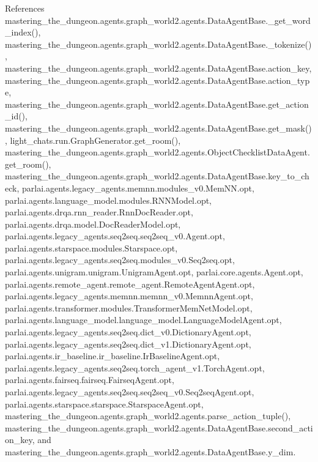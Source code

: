 References mastering\+\_\+the\+\_\+dungeon.\+agents.\+graph\+\_\+world2.\+agents.\+Data\+Agent\+Base.\+\_\+get\+\_\+word\+\_\+index(), mastering\+\_\+the\+\_\+dungeon.\+agents.\+graph\+\_\+world2.\+agents.\+Data\+Agent\+Base.\+\_\+tokenize(), mastering\+\_\+the\+\_\+dungeon.\+agents.\+graph\+\_\+world2.\+agents.\+Data\+Agent\+Base.\+action\+\_\+key, mastering\+\_\+the\+\_\+dungeon.\+agents.\+graph\+\_\+world2.\+agents.\+Data\+Agent\+Base.\+action\+\_\+type, mastering\+\_\+the\+\_\+dungeon.\+agents.\+graph\+\_\+world2.\+agents.\+Data\+Agent\+Base.\+get\+\_\+action\+\_\+id(), mastering\+\_\+the\+\_\+dungeon.\+agents.\+graph\+\_\+world2.\+agents.\+Data\+Agent\+Base.\+get\+\_\+mask(), light\+\_\+chats.\+run.\+Graph\+Generator.\+get\+\_\+room(), mastering\+\_\+the\+\_\+dungeon.\+agents.\+graph\+\_\+world2.\+agents.\+Object\+Checklist\+Data\+Agent.\+get\+\_\+room(), mastering\+\_\+the\+\_\+dungeon.\+agents.\+graph\+\_\+world2.\+agents.\+Data\+Agent\+Base.\+key\+\_\+to\+\_\+check, parlai.\+agents.\+legacy\+\_\+agents.\+memnn.\+modules\+\_\+v0.\+Mem\+N\+N.\+opt, parlai.\+agents.\+language\+\_\+model.\+modules.\+R\+N\+N\+Model.\+opt, parlai.\+agents.\+drqa.\+rnn\+\_\+reader.\+Rnn\+Doc\+Reader.\+opt, parlai.\+agents.\+drqa.\+model.\+Doc\+Reader\+Model.\+opt, parlai.\+agents.\+legacy\+\_\+agents.\+seq2seq.\+seq2seq\+\_\+v0.\+Agent.\+opt, parlai.\+agents.\+starspace.\+modules.\+Starspace.\+opt, parlai.\+agents.\+legacy\+\_\+agents.\+seq2seq.\+modules\+\_\+v0.\+Seq2seq.\+opt, parlai.\+agents.\+unigram.\+unigram.\+Unigram\+Agent.\+opt, parlai.\+core.\+agents.\+Agent.\+opt, parlai.\+agents.\+remote\+\_\+agent.\+remote\+\_\+agent.\+Remote\+Agent\+Agent.\+opt, parlai.\+agents.\+legacy\+\_\+agents.\+memnn.\+memnn\+\_\+v0.\+Memnn\+Agent.\+opt, parlai.\+agents.\+transformer.\+modules.\+Transformer\+Mem\+Net\+Model.\+opt, parlai.\+agents.\+language\+\_\+model.\+language\+\_\+model.\+Language\+Model\+Agent.\+opt, parlai.\+agents.\+legacy\+\_\+agents.\+seq2seq.\+dict\+\_\+v0.\+Dictionary\+Agent.\+opt, parlai.\+agents.\+legacy\+\_\+agents.\+seq2seq.\+dict\+\_\+v1.\+Dictionary\+Agent.\+opt, parlai.\+agents.\+ir\+\_\+baseline.\+ir\+\_\+baseline.\+Ir\+Baseline\+Agent.\+opt, parlai.\+agents.\+legacy\+\_\+agents.\+seq2seq.\+torch\+\_\+agent\+\_\+v1.\+Torch\+Agent.\+opt, parlai.\+agents.\+fairseq.\+fairseq.\+Fairseq\+Agent.\+opt, parlai.\+agents.\+legacy\+\_\+agents.\+seq2seq.\+seq2seq\+\_\+v0.\+Seq2seq\+Agent.\+opt, parlai.\+agents.\+starspace.\+starspace.\+Starspace\+Agent.\+opt, mastering\+\_\+the\+\_\+dungeon.\+agents.\+graph\+\_\+world2.\+agents.\+parse\+\_\+action\+\_\+tuple(), mastering\+\_\+the\+\_\+dungeon.\+agents.\+graph\+\_\+world2.\+agents.\+Data\+Agent\+Base.\+second\+\_\+action\+\_\+key, and mastering\+\_\+the\+\_\+dungeon.\+agents.\+graph\+\_\+world2.\+agents.\+Data\+Agent\+Base.\+y\+\_\+dim.

